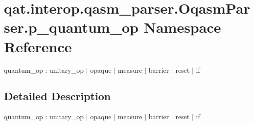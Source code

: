 \hypertarget{namespaceqat_1_1interop_1_1qasm__parser_1_1OqasmParser_1_1p__quantum__op}{\section{qat.\-interop.\-qasm\-\_\-parser.\-Oqasm\-Parser.\-p\-\_\-quantum\-\_\-op Namespace Reference}
\label{namespaceqat_1_1interop_1_1qasm__parser_1_1OqasmParser_1_1p__quantum__op}
}


quantum\-\_\-op \-: unitary\-\_\-op $|$ opaque $|$ measure $|$ barrier $|$ reset $|$ if  




\subsection{Detailed Description}
quantum\-\_\-op \-: unitary\-\_\-op $|$ opaque $|$ measure $|$ barrier $|$ reset $|$ if 